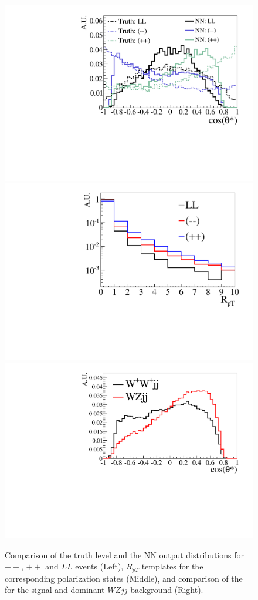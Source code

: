 \begin{figure}
\includegraphics[width=.32\textwidth,height=.18\textheight]{./fig/1d_templates_graph_X.pdf}
\includegraphics[width=.32\textwidth,height=.18\textheight]{./fig/ratios_LLRROO_graph.pdf}
\includegraphics[width=.32\textwidth,height=.18\textheight]{./fig/1d_wz_bg_graph_X.pdf}
\caption{\label{fig:polarization_comparison} Comparison of the truth level \cts and the 
NN output \ctsNN distributions for $--$, $++$ and $LL$ events (Left), 
$R_{pT}$ templates for the corresponding polarization states (Middle), 
and comparison of the \ctsNN for the signal and dominant $WZjj$ background (Right).}
\end{figure}

